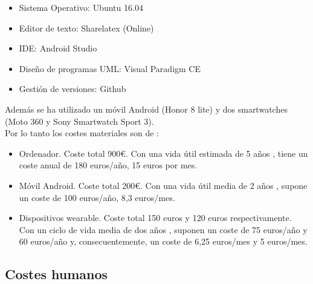 \begin{itemize}
\setlength\itemsep{0em}
    \item Sistema Operativo: Ubuntu 16.04
    \item Editor de texto: Sharelatex (Online)
    \item IDE: Android Studio
    \item Diseño de programas UML: Visual Paradigm CE
    \item Gestión de versiones: Github
\end{itemize}
\noindent
Además se ha utilizado un móvil Android (Honor 8 lite) y dos smartwatches (Moto 360 y Sony Smartwatch Sport 3).
\\
Por lo tanto los costes materiales son de :
\begin{itemize}
\setlength\itemsep{0em}
    \item Ordenador. Coste total 900€. Con una vida útil estimada de 5 años \cite{lifespan}, tiene un coste anual de 180 euros/año, 15 euros por mes.
    \item Móvil Android. Coste total 200€. Con una vida útil media de 2 años \cite{nytimes}, supone un coste de 100 euros/año, 8,3 euros/mes.
    \item Dispositivos wearable. Coste total 150 euros y 120 euros respectivamente. Con un ciclo de vida media de dos años \cite{authority}, suponen un coste de 75 euros/año y 60 euros/año y, consecuentemente, un coste de 6,25 euros/mes y 5 euros/mes.
\end{itemize}

\subsection*{Costes humanos}

